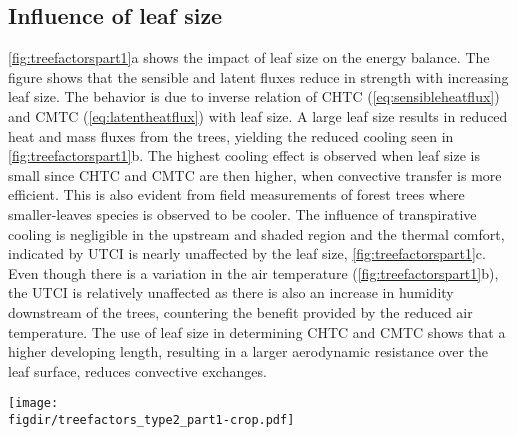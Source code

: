 \subsection{Influence of leaf size}

\cref{fig:treefactorspart1}a shows the impact of leaf size on the energy balance. The figure shows that the sensible and latent fluxes reduce in strength with increasing leaf size. The behavior is due to inverse relation of CHTC (\cref{eq:sensibleheatflux}) and CMTC (\cref{eq:latentheatflux}) with leaf size. A large leaf size results in reduced heat and mass fluxes from the trees, yielding the reduced cooling seen in \cref{fig:treefactorspart1}b. The highest cooling effect is observed when leaf size is small since CHTC and CMTC are then higher, when convective transfer is more efficient. This is also evident from field measurements of forest trees where smaller-leaves species is observed to be cooler\citep{Leuzinger2007,Leuzinger2010}. The influence of transpirative cooling is negligible in the upstream and shaded region and the thermal comfort, indicated by UTCI is nearly unaffected by the leaf size, \cref{fig:treefactorspart1}c. Even though there is a variation in the air temperature (\cref{fig:treefactorspart1}b), the UTCI is relatively unaffected as there is also an increase in humidity downstream of the trees, countering the benefit provided by the reduced air temperature. The use of leaf size in determining CHTC and CMTC shows that a higher developing length, resulting in a larger aerodynamic resistance over the leaf surface, reduces convective exchanges.


	\begin{sidewaysfigure}[p]
	\centering
	\texttt{[image: \\figdir/treefactors\_type2\_part1-crop.pdf]}
	\caption{Influence of leaf size $l$ (m)  on the net energy balance of radiation, sensible and latent heat fluxes at the trees, $\int a \cdot (q_{\textit{rad,leaf}}-q_{\textit{sen,leaf}}-q_{\textit{lat,leaf}})\ dA = 0$ W\,m$^{-1}$,  on air temperature $T-T_0$ ($^{\circ}$C), and  $\textit{UTCI}$ ($^{\circ}$C). Point measurement of air temperature and $UTCI$ at three locations as shown in \cref{fig:domain}: \textit{upstream} ({\color{flatuidarkred}\textbf{red}}), \textit{downstream} ({\color{flatuidarkblue}\textbf{blue}}) and \textit{shaded} (\textbf{black}) for transpiring (T) (solid, ---) and non-transpiring (NT) conditions (dashed, - - -).}
	\label{fig:treefactorspart1}
	\end{sidewaysfigure}

